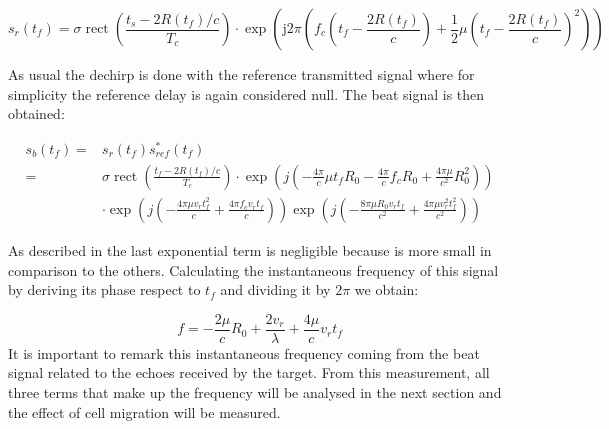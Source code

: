 \begin{equation}
s_{r}\left(t_{f}\right)=\sigma \operatorname{rect}\left(\frac{t_{s}-2 R(t_{f})/ c}{T_{c}}\right) \cdot \exp \left(\mathrm{j} 2 \pi\left(f_{c}\left(t_{f}-\frac{2 R(t_{f})}{c}\right)+\frac{1}{2} \mu\left(t_{f}-\frac{2 R(t_{f})}{c}\right)^{2}\right)\right)
\end{equation}

As usual the dechirp is done with the reference transmitted signal where for simplicity the reference delay is again considered null. The beat signal is then obtained:

\begin{equation}
\begin{aligned}
s_{b}\left(t_{f}\right)=& s_{r}\left(t_{f}\right) s_{r e f}^{*}\left(t_{f}\right) \\
=& \sigma \operatorname{rect}\left(\frac{t_{f}-2 R(t_{f}) / c}{T_{c}}\right) \cdot \exp \left(j\left(-\frac{4 \pi}{c} \mu t_{f} R_{0}-\frac{4 \pi}{c} f_{c} R_{0}+\frac{4 \pi \mu}{c^{2}} R_{0}^{2}\right)\right) \\
& \cdot \exp \left(j\left(-\frac{4 \pi \mu v_{r} t_{f}^{2}}{c}+\frac{4 \pi f_{c} v_{r} t_{f}}{c}\right)\right) \exp \left(j\left(-\frac{8 \pi \mu R_{0} v_{r} t_{f}}{c^{2}}+\frac{4 \pi \mu v_{r}^{2} t_{f}^{2}}{c^{2}}\right)\right)
\end{aligned}
\end{equation}


As described in \cite{chen_chinese} the last exponential term is negligible because is more small in comparison to the others. Calculating the instantaneous frequency of this signal by deriving its phase respect to $t_{f}$ and dividing it by $2\pi$ we obtain:

\begin{equation}
f=-\frac{2 \mu}{c} R_{0}+\frac{2 v_{r}}{\lambda}+\frac{4 \mu}{c} v_{r} t_{f}
\label{instafreq}
\end{equation}
It is important to remark this instantaneous frequency coming from the beat signal related to the echoes received by the target. From this measurement, all three terms that make up the frequency will be analysed in the next section and the effect of cell migration will be measured.


